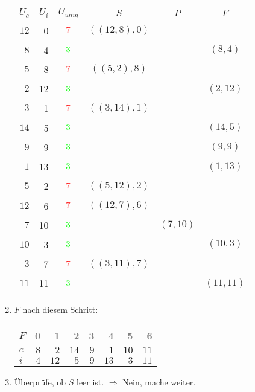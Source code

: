\begin{enumerate}
\begin{center}
\small\begin{tabular}{rrcccc}
\toprule 
 $U_c$ & $U_i$ & $U_{uniq}$ &     $S$      &   $P$   &   $F$   \\
\midrule 
$12$ & 0 & $$\xmarkc$$ & $((12, 8), 0)$ &       &       \\
$ 8$ & 4 & $$\cmarkc$$  &            &       & $( 8, 4)$\\
$ 5$ & 8 & $$\xmarkc$$ & $(( 5, 2), 8)$ &       &       \\
$ 2$ & 12 & $$\cmarkc$$  &            &       & $( 2,12)$\\
$ 3$ & 1 & $$\xmarkc$$ & $(( 3,14), 1)$ &       &       \\
$14$ & 5 & $$\cmarkc$$  &            &       & $(14, 5)$\\
$ 9$ & 9 & $$\cmarkc$$  &            &       & $( 9, 9)$\\
$ 1$ & 13 & $$\cmarkc$$  &            &       & $( 1,13)$\\
$ 5$ & 2 & $$\xmarkc$$ & $(( 5,12), 2)$ &       &       \\
$12$ & 6 & $$\xmarkc$$ & $((12, 7), 6)$ &       &       \\
$ 7$ & 10 & $$\cmarkc$$  &            & $( 7,10)$ &       \\
$10$ & 3 & $$\cmarkc$$  &            &       & $(10, 3)$\\
$ 3$ & 7 & $$\xmarkc$$ & $(( 3,11), 7)$ &       &       \\
$11$ & 11 & $$\cmarkc$$  &            &       & $(11,11)$\\
\bottomrule 
\end{tabular}
\end{center}
\item 
$F$ nach diesem Schritt:
\begin{center}
\small\begin{tabular}{lrrrrrrr}
    \toprule 
    $F$ & \textcolor{gray}{0} & \textcolor{gray}{1} & \textcolor{gray}{2} & \textcolor{gray}{3} & \textcolor{gray}{4} & \textcolor{gray}{5} & \textcolor{gray}{6}\\
    \midrule 
    $c$ & $8$ & $2$ & $14$ & $9$ & $1$ & $10$ & $11$ \\
    $i$ & $4$ & $12$ & $5$ & $9$ & $13$ & $3$ & $11$ \\
    \bottomrule 
\end{tabular}
\end{center}

\item 
Überprüfe, ob $S$ leer ist.
$\Rightarrow$ Nein, mache weiter.


\end{enumerate}
